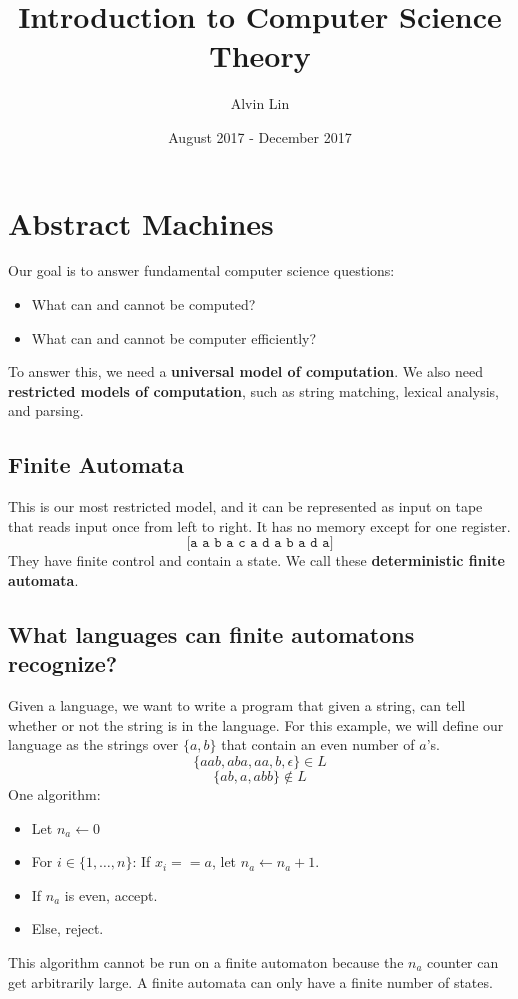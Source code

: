 \documentclass[letterpaper, 12pt]{math}
\title{Introduction to Computer Science Theory}
\author{Alvin Lin}
\date{August 2017 - December 2017}
\begin{document}
\maketitle

\section*{Abstract Machines}
Our goal is to answer fundamental computer science questions:
\begin{itemize}
  \item What can and cannot be computed?
  \item What can and cannot be computer efficiently?
\end{itemize}
To answer this, we need a \textbf{universal model of computation}. We also need
\textbf{restricted models of computation}, such as string matching, lexical
analysis, and parsing.

\subsection*{Finite Automata}
This is our most restricted model, and it can be represented as input on tape
that reads input once from left to right. It has no memory except for one
register.
\[ \texttt{[a a b a c a d a b a d a]} \]
They have finite control and contain a state. We call these
\textbf{deterministic finite automata}.

\subsection*{What languages can finite automatons recognize?}
Given a language, we want to write a program that given a string, can tell
whether or not the string is in the language. For this example, we will define
our language as the strings over \( \{a,b\} \) that contain an even number of
\( a \)'s.
\[ \{aab,aba,aa,b,\epsilon\}\in L \]
\[ \{ab,a,abb\}\notin L \]
One algorithm:
\begin{itemize}
  \item Let \( n_a \leftarrow 0 \)
  \item For \( i\in\{1,\dots,n\} \): If \( x_i == a \), let \( n_a\leftarrow
  n_a+1 \).
  \item If \( n_a \) is even, accept.
  \item Else, reject.
\end{itemize}
This algorithm cannot be run on a finite automaton because the \( n_a \)
counter can get arbitrarily large. A finite automata can only have a finite
number of states.
\end{document}
